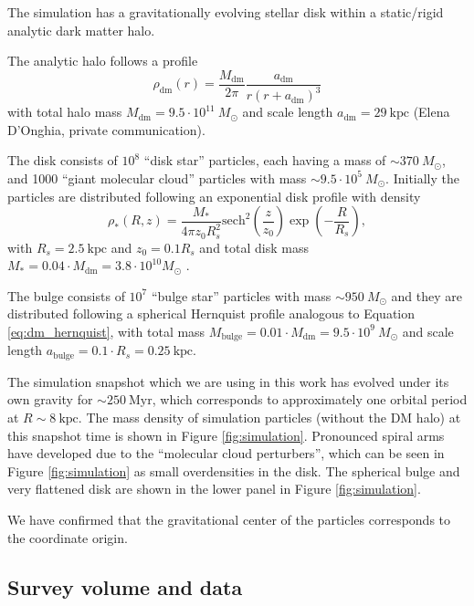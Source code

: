 \documentclass[iop,revtex4,numberedappendix,appendixfloats]{emulateapj}
\begin{document}
The simulation has a gravitationally evolving stellar disk within a static/rigid analytic dark matter halo.

The analytic halo follows a \citet{1990ApJ...356..359H} profile
\begin{equation}
\rho_\text{dm}(r) = \frac{M_\text{dm}}{2\pi} \frac{a_\text{dm}}{r (r+a_\text{dm})^3} \label{eq:dm_hernquist}
\end{equation}
with total halo mass $M_\text{dm} = 9.5\cdot 10^{11} ~M_\odot$ and scale length $a_\text{dm} = 29~\text{kpc}$ (Elena D'Onghia, private communication).

The disk consists of $10^8$ ``disk star'' particles, each having a mass of $\sim370 ~M_\odot$, and 1000 ``giant molecular cloud'' particles with mass $\sim9.5\cdot 10^{5} ~M_\odot$. Initially the particles are distributed following an exponential disk profile with density
\begin{equation}
\rho_*(R,z) = \frac{M_*}{4\pi z_0 R_s^2} \text{sech}^2 \left( \frac{z}{z_0}\right) \exp \left(- \frac{R}{R_s} \right), \label{eq:sech_disk}
\end{equation}
with $R_s = 2.5~\text{kpc}$ and $z_0=0.1R_s$ and total disk mass $M_* = 0.04\cdot M_\text{dm} = 3.8\cdot 10^{10} M_\odot$ .

The bulge consists of $10^7$ ``bulge star'' particles with mass $\sim950 ~M_\odot$ and they are distributed following a spherical Hernquist profile analogous to Equation \eqref{eq:dm_hernquist}, with total mass $M_\text{bulge}=0.01 \cdot M_\text{dm} = 9.5\cdot 10^9~M_\odot$ and scale length $a_\text{bulge}=0.1\cdot R_s=0.25~\text{kpc}$.

The simulation snapshot which we are using in this work has evolved under its own gravity for $\sim 250~\text{Myr}$, which corresponds to approximately one orbital period at $R\sim8~\text{kpc}$. The mass density of simulation particles (without the DM halo) at this snapshot time is shown in Figure \ref{fig:simulation}. Pronounced spiral arms have developed due to the ``molecular cloud perturbers'', which can be seen in Figure \ref{fig:simulation} as small overdensities in the disk. The spherical bulge and very flattened disk are shown in the lower panel in Figure \ref{fig:simulation}.

We have confirmed that the gravitational center of the particles corresponds to the coordinate origin.

\subsection{Survey volume and data}
\end{document}
